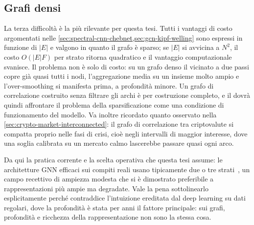 \subsection{Grafi densi}
La terza difficoltà è la più rilevante per questa tesi. Tutti i vantaggi di costo argomentati nelle \cref{sec:spectral-cnn-chebnet,sec:gcn-kipf-welling} sono espressi in funzione di $|E|$ e valgono in quanto il grafo è sparso; se $|E|$ si avvicina a $N^2$, il costo $O(|E|F)$ per strato ritorna quadratico e il vantaggio computazionale svanisce. Il problema non è solo di costo: su un grafo denso il vicinato a due passi copre già quasi tutti i nodi, l'aggregazione media su un insieme molto ampio e l'over-smoothing si manifesta prima, a profondità minore. Un grafo di correlazione costruito senza filtrare gli archi è per costruzione completo, e il  dovrà quindi affrontare il problema della sparsificazione come una condizione di funzionamento del modello. Va inoltre ricordato quanto osservato nella \cref{sec:crypto-market-interconnected}: il grafo di correlazione tra criptovalute si compatta proprio nelle fasi di crisi, cioè negli intervalli di maggior interesse, dove una soglia calibrata su un mercato calmo lascerebbe passare quasi ogni arco.

Da qui la pratica corrente e la scelta operativa che questa tesi assume: le architetture GNN efficaci sui compiti reali usano tipicamente due o tre strati~\cite{wu2021survey}, un campo recettivo di ampiezza modesta che si è dimostrato preferibile a rappresentazioni più ampie ma degradate. Vale la pena sottolinearlo esplicitamente perché contraddice l'intuizione ereditata dal deep learning su dati regolari, dove la profondità è stata per anni il fattore principale: sui grafi, profondità e ricchezza della rappresentazione non sono la stessa cosa.
